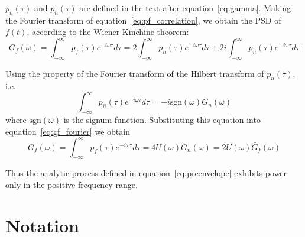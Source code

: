 \documentclass[11pt]{article}
\begin{document}
$p_n(\tau)$ and $p_{\hat{n}}(\tau)$ are defined in the text after equation~\eqref{eq:gamma}. Making the Fourier transform of equation~\eqref{eq:pf_correlation}, we obtain the PSD of $f(t)$, according to the Wiener-Kinchine theorem:
\begin{equation}
G_f(\omega) = \int_{-\infty}^{\infty} p_f(\tau) e^{-i\omega\tau} d\tau = 2 \int_{-\infty}^{\infty} p_n(\tau) e^{-i\omega\tau} d\tau + 2i \int_{-\infty}^{\infty} p_{\hat{n}}(\tau) e^{-i\omega\tau} d\tau
\label{eq:gf_fourier}
\end{equation}

Using the property of the Fourier transform of the Hilbert transform of $p_n(\tau)$, i.e. \cite{papoulis1984}
\begin{equation}
\int_{-\infty}^{\infty} p_{\hat{n}}(\tau) e^{-i\omega\tau} d\tau = -i \text{sgn}(\omega) G_n(\omega)
\label{eq:hilbert_fourier}
\end{equation}
where $\text{sgn}(\omega)$ is the signum function. Substituting this equation into equation~\eqref{eq:gf_fourier} we obtain
\begin{equation}
G_f(\omega) = \int_{-\infty}^{\infty} p_f(\tau) e^{-i\omega\tau} d\tau = 4U(\omega) G_n(\omega) = 2U(\omega) \bar{G}_f(\omega)
\label{eq:gf_final}
\end{equation}

Thus the analytic process defined in equation~\eqref{eq:preenvelope} exhibits power only in the positive frequency range.

\section{Notation}
\label{app:notation}
\end{document}
